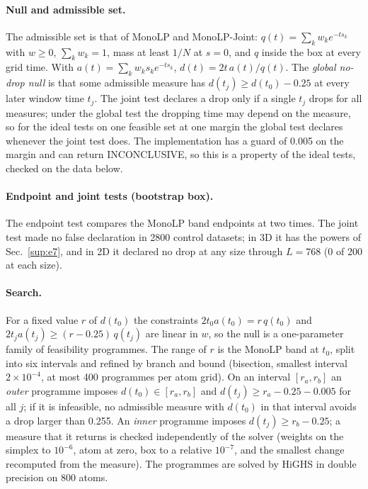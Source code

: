 \documentclass[aps,pre,twocolumn,superscriptaddress,nofootinbib,10pt]{revtex4-2}
\newcommand{\nm}[1]{\textsf{#1}}
\newcommand{\MLP}{\nm{MonoLP}}
\begin{document}
\paragraph*{Null and admissible set.}
The admissible set is that of \textsf{MonoLP} and \textsf{MonoLP-Joint}: $q(t)=\sum_k w_k e^{-ts_k}$ with $w\ge0$, $\sum_k w_k=1$, mass at least $1/N$ at $s=0$, and $q$ inside the box at every grid time. With $a(t)=\sum_k w_k s_k e^{-ts_k}$, $d(t)=2t\,a(t)/q(t)$. The \emph{global no-drop null} is that some admissible measure has $d(t_j)\ge d(t_0)-0.25$ at every later window time $t_j$. The joint test declares a drop only if a single $t_j$ drops for all measures; under the global test the dropping time may depend on the measure, so for the ideal tests on one feasible set at one margin the global test declares whenever the joint test does. The implementation has a guard of 0.005 on the margin and can return INCONCLUSIVE, so this is a property of the ideal tests, checked on the data below.

\paragraph*{Endpoint and joint tests (bootstrap box).}
The endpoint test compares the \MLP{} band endpoints at two times. The joint test made no false declaration in 2800 control datasets; in 3D it has the powers of Sec.~\ref{sup:e7}, and in 2D it declared no drop at any size through $L=768$ (0 of 200 at each size).

\paragraph*{Search.}
For a fixed value $r$ of $d(t_0)$ the constraints $2t_0a(t_0)=r\,q(t_0)$ and $2t_ja(t_j)\ge(r-0.25)\,q(t_j)$ are linear in $w$, so the null is a one-parameter family of feasibility programmes. The range of $r$ is the \textsf{MonoLP} band at $t_0$, split into six intervals and refined by branch and bound (bisection, smallest interval $2\times10^{-4}$, at most 400 programmes per atom grid). On an interval $[r_a,r_b]$ an \emph{outer} programme imposes $d(t_0)\in[r_a,r_b]$ and $d(t_j)\ge r_a-0.25-0.005$ for all $j$; if it is infeasible, no admissible measure with $d(t_0)$ in that interval avoids a drop larger than 0.255. An \emph{inner} programme imposes $d(t_j)\ge r_b-0.25$; a measure that it returns is checked independently of the solver (weights on the simplex to $10^{-6}$, atom at zero, box to a relative $10^{-7}$, and the smallest change recomputed from the measure). The programmes are solved by HiGHS in double precision on 800 atoms.
\end{document}

